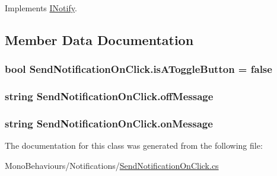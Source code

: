 Implements \hyperlink{interface_i_notify_a13cf2c4d37b9a6c000f6f51c0f84a901}{I\+Notify}.



\subsection{Member Data Documentation}
\subsubsection[{\texorpdfstring{is\+A\+Toggle\+Button}{isAToggleButton}}]{\setlength{\rightskip}{0pt plus 5cm}bool Send\+Notification\+On\+Click.\+is\+A\+Toggle\+Button = false}\hypertarget{class_send_notification_on_click_a9ba6c4c9f8ae9da8c047f39225a148aa}{}\label{class_send_notification_on_click_a9ba6c4c9f8ae9da8c047f39225a148aa}
\subsubsection[{\texorpdfstring{off\+Message}{offMessage}}]{\setlength{\rightskip}{0pt plus 5cm}string Send\+Notification\+On\+Click.\+off\+Message}\hypertarget{class_send_notification_on_click_a26d7af8d15c31791b8470aad804c0f36}{}\label{class_send_notification_on_click_a26d7af8d15c31791b8470aad804c0f36}
\subsubsection[{\texorpdfstring{on\+Message}{onMessage}}]{\setlength{\rightskip}{0pt plus 5cm}string Send\+Notification\+On\+Click.\+on\+Message}\hypertarget{class_send_notification_on_click_aab75dbe9cf09b148b8cc477d447dfd59}{}\label{class_send_notification_on_click_aab75dbe9cf09b148b8cc477d447dfd59}


The documentation for this class was generated from the following file\+:\begin{DoxyCompactItemize}
\item 
Mono\+Behaviours/\+Notifications/\hyperlink{_send_notification_on_click_8cs}{Send\+Notification\+On\+Click.\+cs}\end{DoxyCompactItemize}
